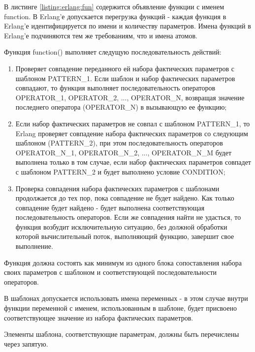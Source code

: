 В листинге \ref{listing:erlang:fun} содержится объявление функции с именем function. В Erlang'е допускается перегрузка функций - каждая функция в Erlang'е идентифицируется по имени и количеству параметров. Имена функций в Erlang'е подчиняются тем же требованиям, что и имена атомов.

Функция function() выполняет следущую последовательность действий:

\begin{enumerate}

	\item Проверяет совпадение переданного ей набора фактических параметров с шаблоном PATTERN\_1. Если шаблон и набор фактических параметров совпадают, то функция выполняет последовательность операторов OPERATOR\_1, OPERATOR\_2, ..., \linebreak OPERATOR\_N, возвращая значение последнего оператора (OPERATOR\_N) в вызывающую ее функцию;

	\item Если набор фактических параметров не совпал с шаблоном PATTERN\_1, то Erlang проверяет совпадение набора фактических параметров со следующим шаблоном \linebreak (PATTERN\_2), при этом последовательность операторов OPERATOR\_N\_1, \linebreak OPERATOR\_N\_2, ..., OPERATOR\_N\_M будет выполнена только в том случае, если набор фактических параметров совпадет с шаблоном PATTERN\_2 и будет выполнено условие CONDITION;

	\item Проверка совпадения набора фактических параметров с шаблонами продолжается до тех пор, пока совпадение не будет найдено. Как только совпадение будет найдено - будет выполнена соответствующая последовательность операторов. Если же совпадения найти не удасться, то функция возбудит исключительную ситуацию, без должной обработки которой вычислительный поток, выполняющий функцию, завершит свое выполнение.

\end{enumerate}

Функция должна состоять как минимум из одного блока сопоставления набора своих параметров с шаблоном и соответствующей последовательности операторов.

В шаблонах допускается использовать имена переменных - в этом случае внутри функции переменной с именем, использованным в шаблоне, будет присвоено соответствующее значение из набора фактических параметров.

Элементы шаблона, соответствующие параметрам, должны быть перечислены через запятую.


